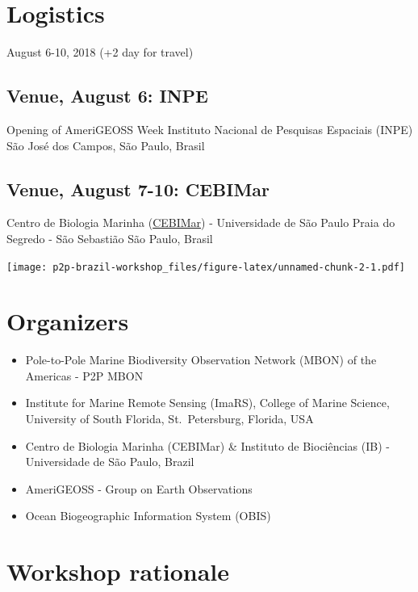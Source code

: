 \documentclass[]{book}
\providecommand{\tightlist}{%
  \setlength{\itemsep}{0pt}\setlength{\parskip}{0pt}}
\theoremstyle{definition}
\theoremstyle{definition}
\theoremstyle{definition}
\theoremstyle{remark}
\begin{document}
\hypertarget{logistics}{%
\section{Logistics}\label{logistics}}

August 6-10, 2018 (+2 day for travel)

\hypertarget{venue-august-6-inpe}{%
\subsection{Venue, August 6: INPE}\label{venue-august-6-inpe}}

Opening of AmeriGEOSS Week Instituto Nacional de Pesquisas Espaciais
(INPE) São José dos Campos, São Paulo, Brasil

\hypertarget{venue-august-7-10-cebimar}{%
\subsection{Venue, August 7-10:
CEBIMar}\label{venue-august-7-10-cebimar}}

Centro de Biologia Marinha
(\href{http://cebimar.usp.br/index.php/en/}{CEBIMar}) - Universidade de
São Paulo Praia do Segredo - São Sebastião São Paulo, Brasil

\texttt{[image: p2p-brazil-workshop\_files/figure-latex/unnamed-chunk-2-1.pdf]}

\hypertarget{organizers}{%
\section{Organizers}\label{organizers}}

\begin{itemize}
\tightlist
\item
  Pole-to-Pole Marine Biodiversity Observation Network (MBON) of the
  Americas - P2P MBON
\item
  Institute for Marine Remote Sensing (ImaRS), College of Marine
  Science, University of South Florida, St.~Petersburg, Florida, USA
\item
  Centro de Biologia Marinha (CEBIMar) \& Instituto de Biociências (IB)
  - Universidade de São Paulo, Brazil
\item
  AmeriGEOSS - Group on Earth Observations
\item
  Ocean Biogeographic Information System (OBIS)
\end{itemize}

\hypertarget{workshop-rationale}{%
\section{Workshop rationale}\label{workshop-rationale}}
\end{document}
